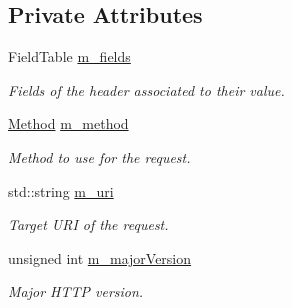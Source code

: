 \subsection*{Private Attributes}
\begin{DoxyCompactItemize}
\item 
\mbox{\label{classsf_1_1_http_1_1_request_a956e3ad74753c26c817fca64af7c79af}} 
Field\+Table \mbox{\hyperlink{classsf_1_1_http_1_1_request_a956e3ad74753c26c817fca64af7c79af}{m\+\_\+fields}}
\begin{DoxyCompactList}\small\item\em Fields of the header associated to their value. \end{DoxyCompactList}\item 
\mbox{\label{classsf_1_1_http_1_1_request_a5f6cecce1933263483692ead4f1b1dde}} 
\mbox{\hyperlink{classsf_1_1_http_1_1_request_a620f8bff6f43e1378f321bf53fbf5598}{Method}} \mbox{\hyperlink{classsf_1_1_http_1_1_request_a5f6cecce1933263483692ead4f1b1dde}{m\+\_\+method}}
\begin{DoxyCompactList}\small\item\em Method to use for the request. \end{DoxyCompactList}\item 
\mbox{\label{classsf_1_1_http_1_1_request_ac02540198edb59c49b3996dc02200991}} 
std\+::string \mbox{\hyperlink{classsf_1_1_http_1_1_request_ac02540198edb59c49b3996dc02200991}{m\+\_\+uri}}
\begin{DoxyCompactList}\small\item\em Target U\+RI of the request. \end{DoxyCompactList}\item 
\mbox{\label{classsf_1_1_http_1_1_request_a13d0fd10599606b0ff24469286a40256}} 
unsigned int \mbox{\hyperlink{classsf_1_1_http_1_1_request_a13d0fd10599606b0ff24469286a40256}{m\+\_\+major\+Version}}
\begin{DoxyCompactList}\small\item\em Major H\+T\+TP version. \end{DoxyCompactList}\item 
\mbox{\label{classsf_1_1_http_1_1_request_a43358640d27bfba18c2fce2bcbb0de5b}} 

\end{DoxyCompactItemize}
